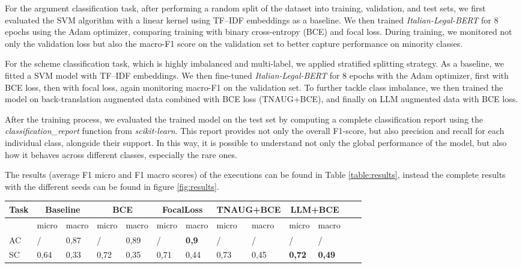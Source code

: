 \documentclass[11pt]{article}
\begin{document}
For the argument classification task, after performing a random split of the dataset into training, validation, and test sets, we first evaluated the SVM algorithm with a linear kernel using TF–IDF embeddings as a baseline. We then trained \textit{Italian-Legal-BERT} for 8 epochs using the Adam optimizer, comparing training with binary cross-entropy (BCE) and focal loss. During training, we monitored not only the validation loss but also the macro-F1 score on the validation set to better capture performance on minority classes.

For the scheme classification task, which is highly imbalanced and multi-label, we applied stratified splitting strategy. As a baseline, we fitted a SVM model with TF–IDF embeddings. We then fine-tuned \textit{Italian-Legal-BERT} for 8 epochs with the Adam optimizer, first with BCE loss, then with focal loss, again monitoring macro-F1 on the validation set. To further tackle class imbalance, we then trained the model on back-translation augmented data combined with BCE loss (TNAUG+BCE), and finally on LLM augmented data with BCE loss. 

After the training process, we evaluated the trained model on the test set by computing a complete classification report using the \textit{classification\_report} function from \textit{scikit-learn}. This report provides not only the overall F1-score, but also precision and recall for each individual class, alongside their support. In this way, it is possible to understand not only the global performance of the model, but also how it behaves across different classes, especially the rare ones.

The results (average F1 micro and F1 macro scores) of the executions can be found in Table \ref{table:results}, instead the complete results with the different seeds can be found in figure \ref{fig:results}. 


\begin{table*}[ht]
    \centering
    \begin{tabular}{|l|l|l|l|l|l|l|l|l|l|l|l|l|}
    \hline
        Task & \multicolumn{2}{c}{Baseline} & \multicolumn{2}{c}{BCE} & \multicolumn{2}{c}{FocalLoss} & \multicolumn{2}{c}{TNAUG+BCE} & \multicolumn{2}{c}{LLM+BCE} \\ \hline
        ~ & micro & macro & micro & macro & micro & macro & micro & macro & micro & macro \\ \hline
        AC & / & 0,87 & / & 0,89 & / & \textbf{0,9} & / & / & / & / \\ \hline
        SC & 0,64 & 0,33 & 0,72 & 0,35 & 0,71 & 0,44 & 0,73 & 0,45 & \textbf{0,72} & \textbf{0,49} \\ \hline
    \end{tabular}
    \caption{Average score over the 3 seeds for AC and SC}
    \label{table:results}
\end{table*}
\end{document}
